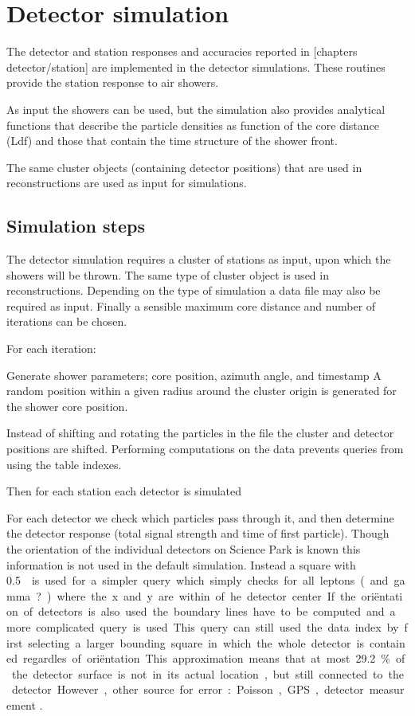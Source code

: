 \section{Detector simulation}

The detector and station responses and accuracies reported in [chapters
detector/station] are implemented in the detector simulations. These routines
provide the station response to air showers.

As input the \corsika showers can be used, but the simulation also
provides analytical functions that describe the particle densities as
function of the core distance (Ldf) and those that contain the time
structure of the shower front.

The same cluster objects (containing detector positions) that are used
in reconstructions are used as input for simulations.


\subsection{Simulation steps}

The detector simulation requires a cluster of stations as input, upon which the showers will be thrown. The same type of cluster object is used in reconstructions. Depending on the type of simulation a \corsika data file may also be required as input. Finally a sensible maximum core distance and number of iterations can be chosen.

For each iteration:

Generate shower parameters; core position, azimuth angle, and timestamp
A random position within a given radius around the cluster origin is generated for the shower core position. 

Instead of shifting and rotating the particles in the \corsika file
the cluster and detector positions are shifted. Performing computations on the \corsika data prevents queries from using the table indexes.

Then for each station each detector is simulated

For each detector we check which particles pass through it, and then determine the detector response (total signal strength and time of first particle).
Though the orientation of the individual detectors on Science Park is known this information is not used in the default simulation. Instead a square with \SI{.5}{\meter\square} is used for a simpler query which simply checks for all leptons (and gamma?) where the x and y are within .. of he detector center. If the oriëntation of detectors is also used the boundary lines have to be computed and a more complicated query is used. This query can still used the data index by first selecting a larger bounding square in which the whole detector is contained regardles of oriëntation. This approximation means that at most \SI{29.2}{\percent} of the detector surface is not in its actual location, but still connected to the detector. However, other source for error: Poisson, GPS, detector measurement .

